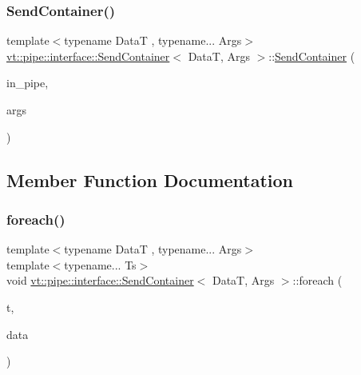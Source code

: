 \subsubsection{\texorpdfstring{Send\+Container()}{SendContainer()}}
{\footnotesize\ttfamily template$<$typename DataT , typename... Args$>$ \\
\hyperlink{structvt_1_1pipe_1_1interface_1_1_send_container}{vt\+::pipe\+::interface\+::\+Send\+Container}$<$ DataT, Args $>$\+::\hyperlink{structvt_1_1pipe_1_1interface_1_1_send_container}{Send\+Container} (\begin{DoxyParamCaption}\item[{\hyperlink{namespacevt_ac9852acda74d1896f48f406cd72c7bd3}{Pipe\+Type} const \&}]{in\+\_\+pipe,  }\item[{Args \&\&...}]{args }\end{DoxyParamCaption})\hspace{0.3cm}{\ttfamily [explicit]}}



\subsection{Member Function Documentation}
\mbox{\label{structvt_1_1pipe_1_1interface_1_1_send_container_ae564de48caa526d02fc218f39c4da8c9}} 
\subsubsection{\texorpdfstring{foreach()}{foreach()}\hspace{0.1cm}{\footnotesize\ttfamily [1/2]}}
{\footnotesize\ttfamily template$<$typename DataT , typename... Args$>$ \\
template$<$typename... Ts$>$ \\
void \hyperlink{structvt_1_1pipe_1_1interface_1_1_send_container}{vt\+::pipe\+::interface\+::\+Send\+Container}$<$ DataT, Args $>$\+::foreach (\begin{DoxyParamCaption}\item[{std\+::tuple$<$ Ts... $>$ const \&}]{t,  }\item[{DataT}]{data }\end{DoxyParamCaption})\hspace{0.3cm}{\ttfamily [private]}}

